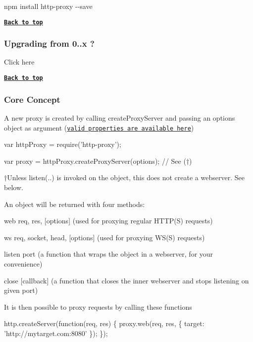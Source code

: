 {\ttfamily npm install http-\/proxy -\/-\/save}

{\bfseries \href{#table-of-contents}{\tt Back to top}}

\subsubsection*{Upgrading from 0..\+x ?}

Click here

{\bfseries \href{#table-of-contents}{\tt Back to top}}

\subsubsection*{Core Concept}

A new proxy is created by calling {\ttfamily create\+Proxy\+Server} and passing an {\ttfamily options} object as argument (\href{lib/http-proxy.js#L33-L50}{\tt valid properties are available here})


\begin{DoxyCode}
var httpProxy = require('http-proxy');

var proxy = httpProxy.createProxyServer(options); // See (†)
\end{DoxyCode}
 †\+Unless listen(..) is invoked on the object, this does not create a webserver. See below.

An object will be returned with four methods\+:


\begin{DoxyItemize}
\item web {\ttfamily req, res, \mbox{[}options\mbox{]}} (used for proxying regular H\+T\+T\+P(\+S) requests)
\item ws {\ttfamily req, socket, head, \mbox{[}options\mbox{]}} (used for proxying W\+S(\+S) requests)
\item listen {\ttfamily port} (a function that wraps the object in a webserver, for your convenience)
\item close {\ttfamily \mbox{[}callback\mbox{]}} (a function that closes the inner webserver and stops listening on given port)
\end{DoxyItemize}

It is then possible to proxy requests by calling these functions


\begin{DoxyCode}
http.createServer(function(req, res) \{
  proxy.web(req, res, \{ target: 'http://mytarget.com:8080' \});
\});
\end{DoxyCode}


